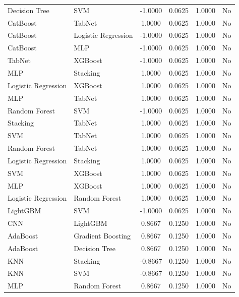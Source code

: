 \documentclass[a4paper,fleqn]{cas-sc}
\begin{document}
{\begin{longtable}{l l c c c c}
Decision Tree       & SVM                 & -1.0000 & 0.0625 & 1.0000 & No \\
CatBoost            & TabNet              &  1.0000 & 0.0625 & 1.0000 & No \\
CatBoost            & Logistic Regression & -1.0000 & 0.0625 & 1.0000 & No \\
CatBoost            & MLP                 & -1.0000 & 0.0625 & 1.0000 & No \\
TabNet              & XGBoost             & -1.0000 & 0.0625 & 1.0000 & No \\
MLP                 & Stacking            &  1.0000 & 0.0625 & 1.0000 & No \\
Logistic Regression & XGBoost             &  1.0000 & 0.0625 & 1.0000 & No \\
MLP                 & TabNet              &  1.0000 & 0.0625 & 1.0000 & No \\
Random Forest       & SVM                 & -1.0000 & 0.0625 & 1.0000 & No \\
Stacking            & TabNet              &  1.0000 & 0.0625 & 1.0000 & No \\
SVM                 & TabNet              &  1.0000 & 0.0625 & 1.0000 & No \\
Random Forest       & TabNet              &  1.0000 & 0.0625 & 1.0000 & No \\
Logistic Regression & Stacking            &  1.0000 & 0.0625 & 1.0000 & No \\
SVM                 & XGBoost             &  1.0000 & 0.0625 & 1.0000 & No \\
MLP                 & XGBoost             &  1.0000 & 0.0625 & 1.0000 & No \\
Logistic Regression & Random Forest       &  1.0000 & 0.0625 & 1.0000 & No \\
LightGBM            & SVM                 & -1.0000 & 0.0625 & 1.0000 & No \\
CNN                 & LightGBM            &  0.8667 & 0.1250 & 1.0000 & No \\
AdaBoost            & Gradient Boosting   &  0.8667 & 0.1250 & 1.0000 & No \\
AdaBoost            & Decision Tree       &  0.8667 & 0.1250 & 1.0000 & No \\
KNN                 & Stacking            & -0.8667 & 0.1250 & 1.0000 & No \\
KNN                 & SVM                 & -0.8667 & 0.1250 & 1.0000 & No \\
MLP                 & Random Forest       &  0.8667 & 0.1250 & 1.0000 & No \\

\end{longtable}}
\end{document}
